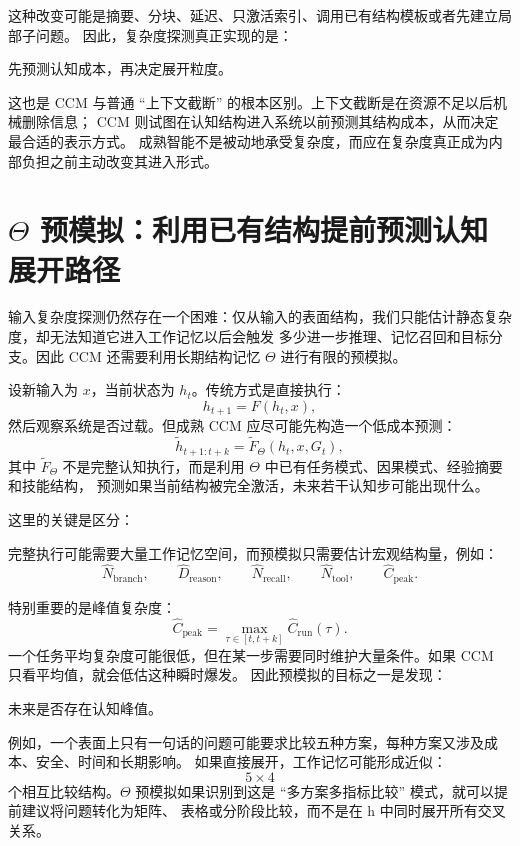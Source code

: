 这种改变可能是摘要、分块、延迟、只激活索引、调用已有结构模板或者先建立局部子问题。
因此，复杂度探测真正实现的是：
\begin{statementbox}
先预测认知成本，再决定展开粒度。
\end{statementbox}

这也是 CCM 与普通 ``上下文截断'' 的根本区别。上下文截断是在资源不足以后机械删除信息；
CCM 则试图在认知结构进入系统以前预测其结构成本，从而决定最合适的表示方式。
成熟智能不是被动地承受复杂度，而应在复杂度真正成为内部负担之前主动改变其进入形式。


\section{$\Theta$ 预模拟：利用已有结构提前预测认知展开路径}

输入复杂度探测仍然存在一个困难：仅从输入的表面结构，我们只能估计静态复杂度，却无法知道它进入工作记忆以后会触发
多少进一步推理、记忆召回和目标分支。因此 CCM 还需要利用长期结构记忆 $\Theta$ 进行有限的预模拟。

设新输入为 $x$，当前状态为 $h_t$。传统方式是直接执行：
\[
h_{t+1}
=
F(h_t,x),
\]
然后观察系统是否过载。但成熟 CCM 应尽可能先构造一个低成本预测：
\[
\widetilde h_{t+1:t+k}
=
\widetilde F_{\Theta}
(h_t,x,G_t),
\]
其中 $\widetilde F_{\Theta}$ 不是完整认知执行，而是利用 $\Theta$ 中已有任务模式、因果模式、经验摘要和技能结构，
预测如果当前结构被完全激活，未来若干认知步可能出现什么。

这里的关键是区分：
\begin{statementbox}
\centering
{}
\end{statementbox}
完整执行可能需要大量工作记忆空间，而预模拟只需要估计宏观结构量，例如：
\[
\widehat N_{\mathrm{branch}},
\qquad
\widehat D_{\mathrm{reason}},
\qquad
\widehat N_{\mathrm{recall}},
\qquad
\widehat N_{\mathrm{tool}},
\qquad
\widehat C_{\mathrm{peak}}.
\]

特别重要的是峰值复杂度：
\[
\widehat C_{\mathrm{peak}}
=
\max_{\tau\in[t,t+k]}
\widehat C_{\mathrm{run}}(\tau).
\]
一个任务平均复杂度可能很低，但在某一步需要同时维护大量条件。如果 CCM 只看平均值，就会低估这种瞬时爆发。
因此预模拟的目标之一是发现：
\begin{statementbox}
未来是否存在认知峰值。
\end{statementbox}

例如，一个表面上只有一句话的问题可能要求比较五种方案，每种方案又涉及成本、安全、时间和长期影响。
如果直接展开，工作记忆可能形成近似：
\[
5\times4
\]
个相互比较结构。$\Theta$ 预模拟如果识别到这是 ``多方案多指标比较'' 模式，就可以提前建议将问题转化为矩阵、
表格或分阶段比较，而不是在 h 中同时展开所有交叉关系。

